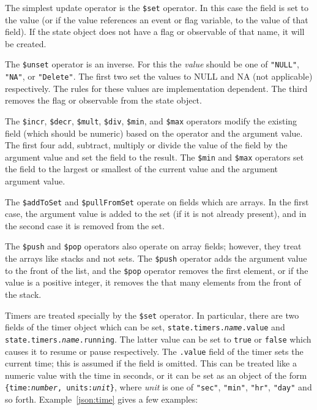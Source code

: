 \documentclass{article}
\begin{document}
  The simplest update operator is the \texttt{\$set} operator.  In
  this case the field is set to the value (or if the value references
  an event or flag variable, to the value of that field).  If the
  state object does not have a flag or observable of that name, it
  will be created. 

  The \texttt{\$unset} operator is an inverse.  For this the
  \textit{value} should be one of \texttt{"NULL"}, \texttt{"NA"}, or
  \texttt{"Delete"}.  The first two set the values to NULL and NA (not
  applicable) respectively.  The rules for these values are
  implementation dependent.  The third removes the flag or observable
  from the state object.

  The \texttt{\$incr}, \texttt{\$decr}, \texttt{\$mult},
  \texttt{\$div}, \texttt{\$min}, and \texttt{\$max} operators modify
  the existing field (which should be numeric) based on the operator
  and the argument value.  The first four add, subtract, multiply or
  divide the value of the field by the argument value and set the
  field to the result.   The \texttt{\$min} and \texttt{\$max}
  operators set the field to the largest or smallest of the current
  value and the argument argument value.

  The \texttt{\$addToSet} and \texttt{\$pullFromSet} operate on fields
  which are arrays.  In the first case, the argument value is added to
  the set (if it is not already present), and in the second case it is
  removed from the set.

  The \texttt{\$push} and \texttt{\$pop} operators also operate on
  array fields; however, they treat the arrays like stacks and not
  sets.  The \texttt{\$push} operator adds the argument value to the
  front of the list, and the \texttt{\$pop} operator removes the first
  element, or if the value is a positive integer, it removes the that
  many elements from the front of the stack.

  Timers are treated specially by the \texttt{\$set} operator.  In
  particular, there are two fields of the timer object which can be
  set, \texttt{state.timers.\textit{name}.value} and
  \texttt{state.timers.\textit{name}.running}.  The latter value can
  be set to \texttt{true} or \texttt{false} which causes it to resume
  or pause respectively.  The \texttt{.value} field of the timer sets
  the current time; this is assumed if the field is omitted.  This can
  be treated like a numeric value with the time in seconds, or it can
  be set as an object of the form \texttt{\{time:\textit{number},
    units:\textit{unit}\}}, where \textit{unit} is one of
  \texttt{"sec"}, \texttt{"min"}, \texttt{"hr"}, \texttt{"day"} and so
  forth.  Example~\ref{json:time} gives a few examples:
  
\end{document}
